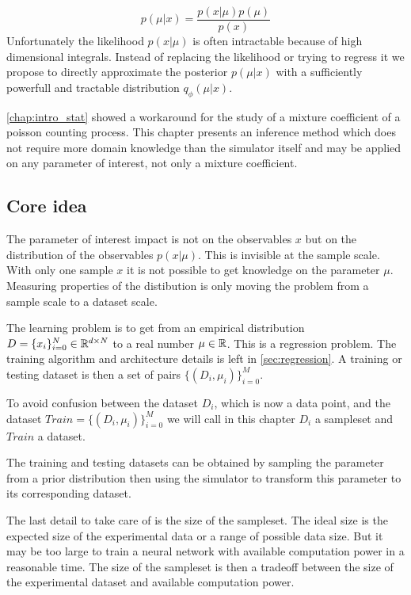\begin{equation}
    p(\mu | x) = \frac{p(x | \mu) p(\mu) }{p(x)}
\end{equation}
Unfortunately the likelihood $p(x | \mu)$ is often intractable because of high dimensional integrals.
Instead of replacing the likelihood or trying to regress it we propose to directly approximate the posterior $p(\mu | x)$ with a sufficiently powerfull and tractable distribution $q_\phi(\mu | x)$.

\autoref{chap:intro_stat} showed a workaround for the study of a mixture coefficient of a poisson counting process.
This chapter presents an inference method which does not require more domain knowledge than the simulator itself and may be applied on any parameter of interest, not only a mixture coefficient.







\subsection{Core idea} %
\label{sub:core_idea}


The parameter of interest impact is not on the observables $x$ but on the distribution of the observables $p(x|\mu)$.
This is invisible at the sample scale.
With only one sample $x$ it is not possible to get knowledge on the parameter $\mu$.
Measuring properties of the distibution is only moving the problem from a sample scale to a dataset scale.

The learning problem is to get from an empirical distribution $D = \{x_i\}_{i=0}^N \in \mathbb{R}^{d\times N}$ to a real number $\mu \in \mathbb{R}$.
This is a regression problem.
The training algorithm and architecture details is left in \autoref{sec:regression}.
A training or testing dataset is then a set of pairs $\{(D_i, \mu_i)\}_{i=0}^M$.

To avoid confusion between the dataset $D_i$, which is now a data point, and the dataset $Train = \{(D_i, \mu_i)\}_{i=0}^M$ we will call in this chapter $D_i$ a sampleset and $Train$ a dataset.

The training and testing datasets can be obtained by sampling the parameter from a prior distribution then using the simulator to transform this parameter to its corresponding dataset.

The last detail to take care of is the size of the sampleset.
The ideal size is the expected size of the experimental data or a range of possible data size.
But it may be too large to train a neural network with available computation power in a reasonable time.
The size of the sampleset is then a tradeoff between the size of the experimental dataset and available computation power.

